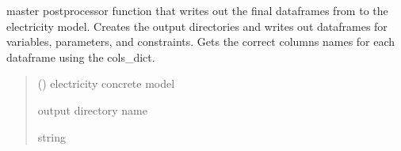 \documentclass[letterpaper,10pt,english]{sphinxmanual}
\begin{document}

\begin{fulllineitems}
\label{\detokenize{src.models.electricity.scripts.postprocessor:src.models.electricity.scripts.postprocessor.postprocessor}}
\pysigstartsignatures
\pysiglinewithargsret
{}
{}
{}
\pysigstopsignatures
\sphinxAtStartPar
master postprocessor function that writes out the final dataframes from to the electricity
model. Creates the output directories and writes out dataframes for variables, parameters, and
constraints. Gets the correct columns names for each dataframe using the cols\_dict.
\begin{quote}\begin{description}
\sphinxAtStartPar
{} () \textendash{} electricity concrete model

\sphinxAtStartPar
output directory name

\sphinxAtStartPar
string

\end{description}\end{quote}

\end{fulllineitems}

\end{document}
